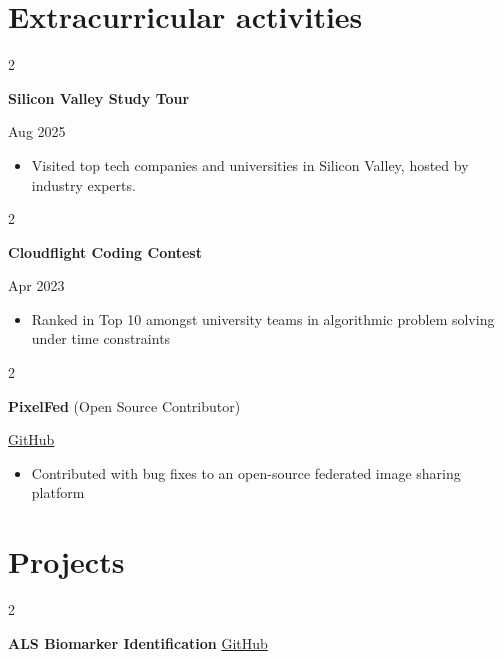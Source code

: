 \documentclass[10pt, letterpaper]{article}
\newenvironment{highlights}{
    \begin{itemize}[
        topsep=0.10 cm,
        parsep=0.10 cm,
        partopsep=0pt,
        itemsep=0pt,
        leftmargin=0 cm + 10pt
    ]
}{
    \end{itemize}
} %
\newenvironment{twocolentry}[2][]{
    \onecolentry
    \def\secondColumn{#2}
    \setcolumnwidth{\fill, 4.5 cm}
    \begin{paracol}{2}
}{
    \switchcolumn \raggedleft \secondColumn
    \end{paracol}
    \endonecolentry
} %
\begin{document}
    \section{Extracurricular activities}
        
        \begin{samepage}

            \begin{twocolentry}{
               Aug 2025
            }
                \textbf{Silicon Valley Study Tour}
            \end{twocolentry}
            \begin{highlights}
              \item Visited top tech companies and universities in Silicon Valley, hosted by industry experts.
            \end{highlights}

            \begin{twocolentry}{
               Apr 2023
            }
                \textbf{Cloudflight Coding Contest}
            \end{twocolentry}
            \begin{highlights}
              \item Ranked in Top 10 amongst university teams in algorithmic problem solving under time constraints
            \end{highlights}

            \begin{twocolentry}{
                \href{https://github.com/pixelfed/pixelfed-rn/pulls?q=author\%3Ademic-dev}{GitHub}
            }
                \textbf{PixelFed} (Open Source Contributor)
            \end{twocolentry}
            \begin{highlights}
              \item Contributed with bug fixes to an open-source federated image sharing platform
            \end{highlights}
            
        \end{samepage}
    
    \section{Projects}

        \begin{twocolentry}{
            \href{https://github.com/demic-dev/als-biomarker-identification-project}{GitHub}
        }
        \textbf{ALS Biomarker Identification}\end{twocolentry}
\end{document}
